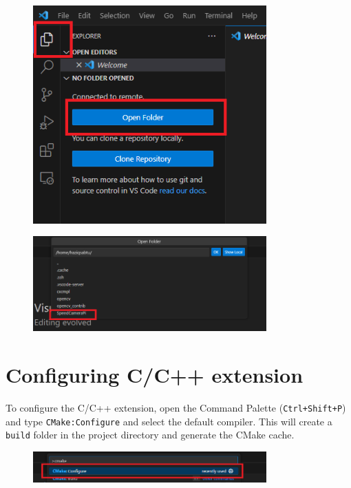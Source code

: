 \begin{figure}[H]
      \centering
      \includegraphics[width=0.8\textwidth]{texs/chapter1/image/wslfolder.png}
\end{figure}

\begin{figure}[H]
      \centering
      \includegraphics[width=0.8\textwidth]{texs/chapter1/image/wslfolder2.png}
\end{figure}

\section{Configuring C/C++ extension}

To configure the C/C++ extension, open the Command Palette (\texttt{Ctrl+Shift+P}) and type \texttt{CMake:Configure} and select the default compiler. This will create a \texttt{build} folder in the project directory and generate the CMake cache.

\begin{figure}[H]
      \centering
      \includegraphics[width=0.8\textwidth]{texs/chapter1/image/cppconf.png}
\end{figure}

